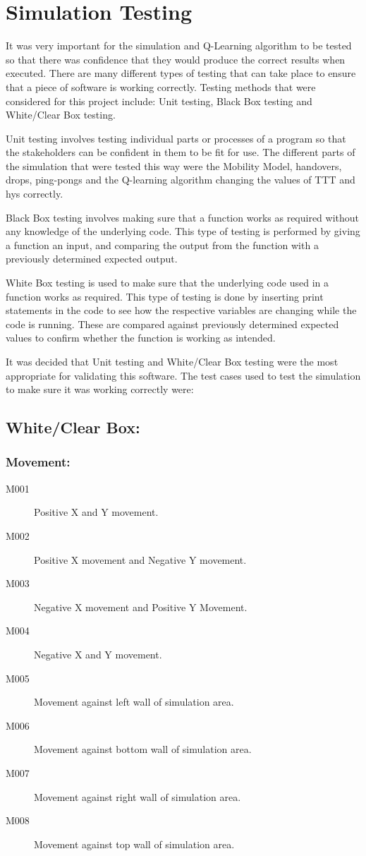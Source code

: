\section{Simulation Testing}
It was very important for the simulation and Q-Learning algorithm to be tested so that there was confidence that they would produce the correct results when executed. There are many different types of testing that can take place to ensure that a piece of software is working correctly. Testing methods that were considered for this project include: Unit testing, Black Box testing and White/Clear Box testing.

Unit testing involves testing individual parts or processes of a program so that the stakeholders can be confident in them to be fit for use. The different parts of the simulation that were tested this way were the Mobility Model, handovers, drops, ping-pongs and the Q-learning algorithm changing the values of TTT and hys correctly.

Black Box testing involves making sure that a function works as required without any knowledge of the underlying code. This type of testing is performed by giving a function an input, and comparing the output from the function with a previously determined expected output.

White Box testing is used to make sure that the underlying code used in a function works as required. This type of testing is done by inserting print statements in the code to see how the respective variables are changing while the code is running. These are compared against previously determined expected values to confirm whether the function is working as intended.

It was decided that Unit testing and White/Clear Box testing were the most appropriate for validating this software. The test cases used to test the simulation to make sure it was working correctly were: 
\subsection*{White/Clear Box:}
\subsubsection*{Movement:}
\begin{description}
\item[M001]	Positive X and Y movement.
\item[M002]	Positive X movement and Negative Y movement.
\item[M003]	Negative X movement and Positive Y Movement.
\item[M004]	Negative X and Y movement.
\item[M005]	Movement against left wall of simulation area.
\item[M006]	Movement against bottom wall of simulation area.
\item[M007]	Movement against right wall of simulation area.
\item[M008]	Movement against top wall of simulation area.
\end{description}
